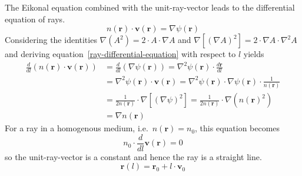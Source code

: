 The Eikonal equation combined with the unit-ray-vector leads to the differential equation of rays.
\begin{equation}\label{ray-differential-equation}
    n(\mathbf{r}) \cdot \mathbf{v}(\mathbf{r}) = \nabla \psi(\mathbf{r})
\end{equation}
Considering the identities \(\nabla(A^2)= 2 \cdot A \cdot \nabla A\) and \(\nabla[{(\nabla A)}^2] = 2 \cdot \nabla A \cdot \nabla^2 A\) and deriving equation~\eqref{ray-differential-equation} with respect to \(l\) yields~\parencite{born_foundations_1999}
\begin{align}
    \frac{d}{dl}(n(\mathbf{r}) \cdot \mathbf{v}(\mathbf{r})) &= \frac{d}{dl}(\nabla \psi(\mathbf{r})) = \nabla^2 \psi(\mathbf{r}) \cdot \frac{d\mathbf{r}}{dl} \\
    &= \nabla^2 \psi(\mathbf{r}) \cdot \mathbf{v}(\mathbf{r}) = \nabla^2 \psi(\mathbf{r}) \cdot \nabla \psi(\mathbf{r}) \cdot \frac{1}{n(\mathbf{r})} \\
    &= \frac{1}{2n(\mathbf{r})} \cdot \nabla[{(\nabla \psi)}^2] = \frac{1}{2n(\mathbf{r})} \cdot \nabla({n(\mathbf{r})}^2) \\
    &= \nabla n(\mathbf{r})
\end{align}
For a ray in a homogenous medium, i.e.~\(n(\mathbf{r}) = n_0\), this equation becomes
\begin{equation}
    n_0 \cdot \frac{d}{dl}\mathbf{v}(\mathbf{r}) = 0
\end{equation}
so the unit-ray-vector is a constant and hence the ray is a straight line.
\begin{equation}
    \mathbf{r}(l) = \mathbf{r}_0 + l \cdot \mathbf{v}_0
\end{equation}


